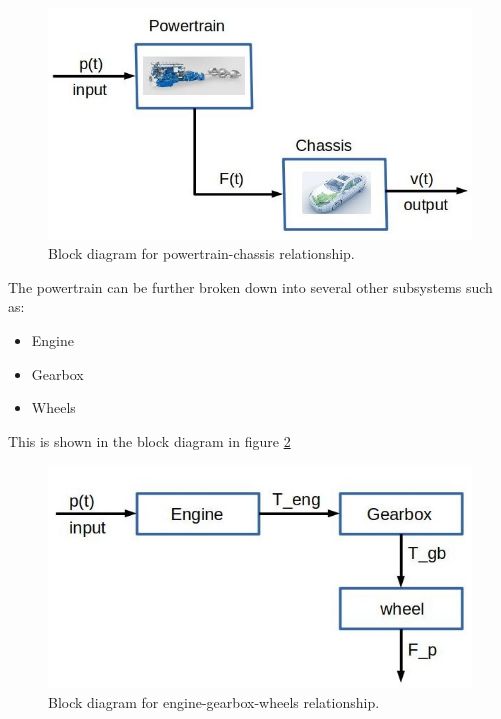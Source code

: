 \begin{figure}[!htb]
\begin{center}
\includegraphics[scale=0.280]{img/model_automotive_sys/powertrain_chassis.jpg}
\end{center}
\caption{Block diagram for powertrain-chassis relationship.}
\label{powertrain_chassis}
\end{figure}

The powertrain can be further broken down into several other subsystems such as:

\begin{itemize}
\item Engine
\item Gearbox
\item Wheels
\end{itemize}

This is shown in the block diagram in figure \ref{engine_gearbox_wheel_block_diagram}


\begin{figure}[!htb]
\begin{center}
\includegraphics[scale=0.280]{img/model_automotive_sys/engine_gearbox_wheel_block_diagram.jpg}
\end{center}
\caption{Block diagram for engine-gearbox-wheels relationship.}
\label{engine_gearbox_wheel_block_diagram}
\end{figure}



